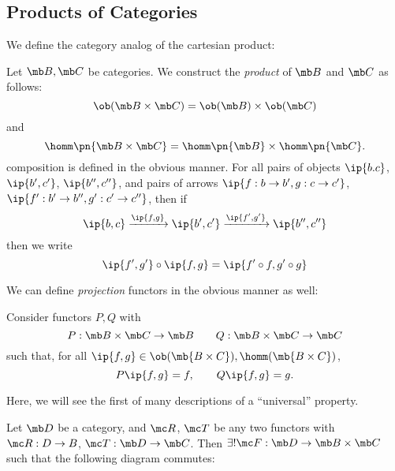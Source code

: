 \documentclass[nocover]{pset}
\begin{document}
\begin{adjustwidth}{1em}{1em}
  \subsection{Products of Categories}
  We define the category analog of the cartesian product:
  \begin{definition}
    Let $\mb B, \mb C$ be categories. We construct the \emph{product}
    of $\mb B$ and $\mb C$ as follows:
    \[
      \ob(\mb B \times \mb C) = \ob(\mb B) \times \ob(\mb C)
    \]
    and
    \[
      \homm\pn{\mb B \times \mb C} = \homm\pn{\mb B} \times
      \homm\pn{\mb C}.
    \]
    composition is defined in the obvious manner. For all pairs of
    objects $\ip{b.c}$, $\ip{b', c'}$, $\ip{b'', c''}$, and pairs of
    arrows $\ip{f : b \to b',g : c \to c'}$, $\ip{f' : b' \to b'', g'
      : c' \to c''}$, then if
    \[
      \ip{b,c} \xrightarrow{\ip{f,g}} \ip{b',c'}
      \xrightarrow{\ip{f',g'}} \ip{b'', c''}
    \]
    then we write
    \[
      \ip{f',g'} \circ \ip{f,g} = \ip{f' \circ f, g' \circ g}
    \]
  \end{definition}
  We can define \emph{projection} functors in the obvious manner as
  well:
  \begin{definition}
    Consider functors $P,Q$ with
    \[
      P : \mb B \times \mb C \to \mb B \qquad Q : \mb B \times \mb C
      \to \mb C
    \]
    such that, for all $\ip{f,g} \in \ob(\mb{B \times C}), \homm(\mb{B
    \times C})$,
    \[
      P\ip{f,g} = f, \qquad Q\ip{f,g} = g.
    \]
  \end{definition}
  Here, we will see the first of many descriptions of a ``universal''
  property.
  \begin{theorem}
    Let $\mb D$ be a category, and $\mc R$, $\mc T$ be any two
    functors with $\mc R : D \to B$, $\mc T : \mb D \to \mb C$. Then
    $\exists! \mc F : \mb D \to \mb B \times \mb C$ such that the
    following diagram commutes:
    \begin{figure}[H]
      \centering
      \tikzset{node distance=2.5cm, auto}
\end{figure}
\end{theorem}
\end{adjustwidth}
\end{document}
